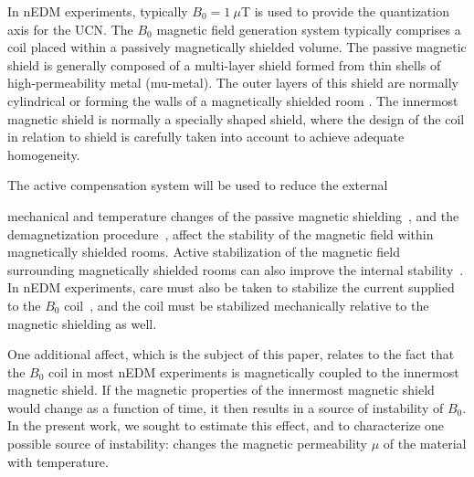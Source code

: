 \documentclass[review]{elsarticle}
\begin{document}

In nEDM experiments, typically $B_0=1~\mu$T is used to provide the
quantization axis for the UCN.
The $B_0$ magnetic field generation system typically comprises a coil
placed within a passively magnetically shielded volume.  The passive
magnetic shield is generally composed of a multi-layer shield formed
from thin shells of high-permeability metal (mu-metal).  The outer
layers of this shield are normally cylindrical \cite{bib:nedm3.5, bib:
  nedm2 } or forming the walls of a magnetically shielded room
\cite{bib:altarev2014}.  The innermost magnetic shield is normally a
specially shaped shield, where the design of the coil in relation to
shield is carefully taken into account to achieve adequate
homogeneity.

%
The active compensation system will be used to reduce the external

mechanical and temperature changes of the passive magnetic
shielding~\cite{bib:voigt,bib:thiel}, and the demagnetization
procedure~\cite{bib:thiel,bib:fierlinger2016}, affect the stability of
the magnetic field within magnetically shielded
rooms.
Active stabilization of the magnetic field surrounding magnetically
shielded rooms can also improve the internal
stability~\cite{bib:franke,bib:voigt, bib:afach}.  In nEDM
experiments, care must also be taken to stabilize the current supplied
to the $B_0$ coil~\cite{bib:brys}, and the coil must be stabilized
mechanically relative to the magnetic shielding as well.



One additional affect, which is the subject of this paper, relates to
the fact that the $B_0$ coil in most nEDM experiments is magnetically
coupled to the innermost magnetic shield.  If the magnetic properties
of the innermost magnetic shield would change as a function of time,
it then results in a source of instability of $B_0$.  In the present
work, we sought to estimate this effect, and to characterize one
possible source of instability: changes the magnetic permeability
$\mu$ of the material with temperature.
\end{document}
